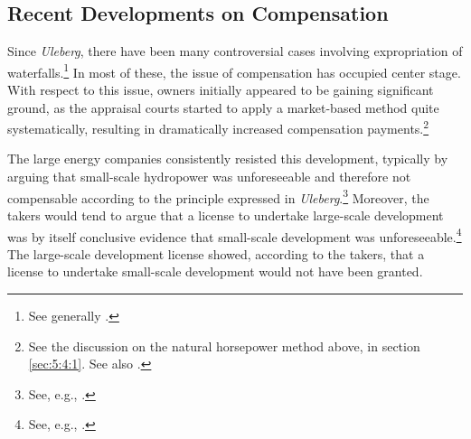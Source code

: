 \subsection{Recent Developments on Compensation}\label{sec:5:5:3}

Since {\it Uleberg}, there have been many controversial cases involving expropriation of waterfalls.\footnote{See generally \cite{larsen06,larsen08,larsen12}.} In most of these, the issue of compensation has occupied center stage. With respect to this issue, owners initially appeared to be gaining significant ground, as the appraisal courts started to apply a market-based method quite systematically, resulting in dramatically increased compensation payments.\footnote{See the discussion on the natural horsepower method above, in section \ref{sec:5:4:1}. See also \cite[278-290]{hauge15}.}

The large energy companies consistently resisted this development, typically by arguing that small-scale hydropower was unforeseeable and therefore not compensable according to the principle expressed in {\it Uleberg}.\footnote{See, e.g., \cite{klovtveit11,otra10,otra13}.} Moreover, the takers would tend to argue that a license to undertake large-scale development was by itself conclusive evidence  that small-scale development was unforeseeable.\footnote{See, e.g., \cite[17]{otra10}.} The large-scale development license showed, according to the takers, that a license to undertake small-scale development would not have been granted.

